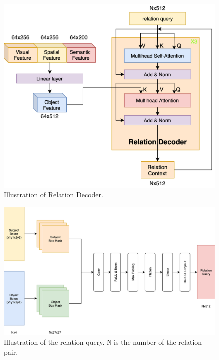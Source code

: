 


\begin{figure}[tbph!]
	\centering
	\includegraphics[width=0.8\linewidth]{figures/relation_decoder}
	\caption[Illustration of Relation Decoder]{Illustration of Relation Decoder.}
	\label{fig:relationdecoder}
\end{figure}

\begin{figure}[tbph!]
	\centering
	\includegraphics[width=0.8\linewidth]{figures/relation_query}
	\caption[Illustration of the relation query]{Illustration of the relation query. N is the number of the relation pair.}
	\label{fig:relationquery}
\end{figure}

